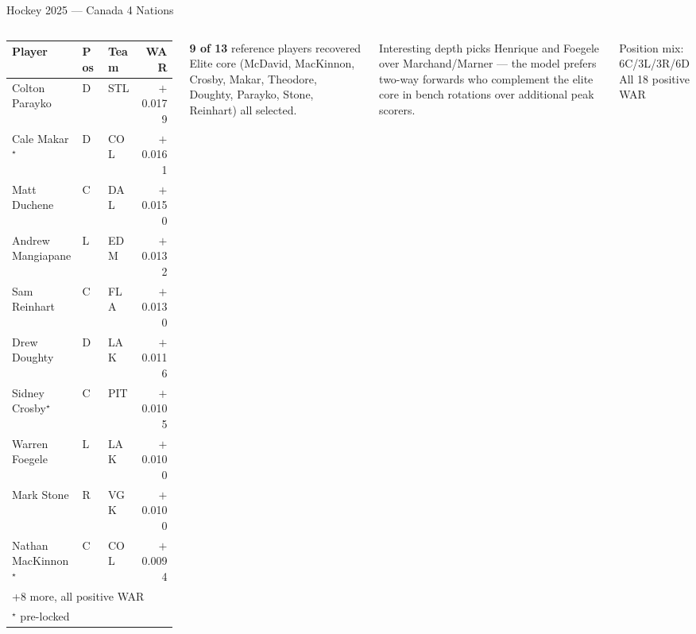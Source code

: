 \documentclass[aspectratio=169,11pt]{beamer}
\newcommand{\good}[1]{\textcolor{bgrn}{\textbf{#1}}}
\begin{document}
\begin{frame}{Hockey 2025 — Canada 4 Nations}
\begin{columns}[T]
\scriptsize\begin{tabular}{lllr}
\toprule
Player & Pos & Team & WAR \\
\midrule
Colton Parayko           & D & STL & $+$0.0179 \\
Cale Makar$^\star$       & D & COL & $+$0.0161 \\
Matt Duchene             & C & DAL & $+$0.0150 \\
Andrew Mangiapane        & L & EDM & $+$0.0132 \\
Sam Reinhart             & C & FLA & $+$0.0130 \\
Drew Doughty             & D & LAK & $+$0.0116 \\
Sidney Crosby$^\star$    & C & PIT & $+$0.0105 \\
Warren Foegele           & L & LAK & $+$0.0100 \\
Mark Stone               & R & VGK & $+$0.0100 \\
Nathan MacKinnon$^\star$ & C & COL & $+$0.0094 \\
\multicolumn{4}{l}{\textcolor{steel}{+8 more, all positive WAR}} \\
\bottomrule
\multicolumn{4}{l}{\textcolor{steel}{$^\star$ pre-locked}}
\end{tabular}

\begin{exampleblock}{\good{9 of 13} reference players recovered}
  \small Elite core (McDavid, MacKinnon, Crosby, Makar, Theodore, Doughty, Parayko, Stone, Reinhart) all selected.
\end{exampleblock}
\vspace{0.4em}
\begin{block}{Interesting depth picks}
  \small Henrique and Foegele over Marchand/Marner — the model prefers two-way forwards who complement the elite core in bench rotations over additional peak scorers.
\end{block}
\vspace{0.3em}
{\small Position mix: 6C/3L/3R/6D \good{\checkmark}\quad All 18 positive WAR \good{\checkmark}}
\end{columns}
\end{frame}
\end{document}
